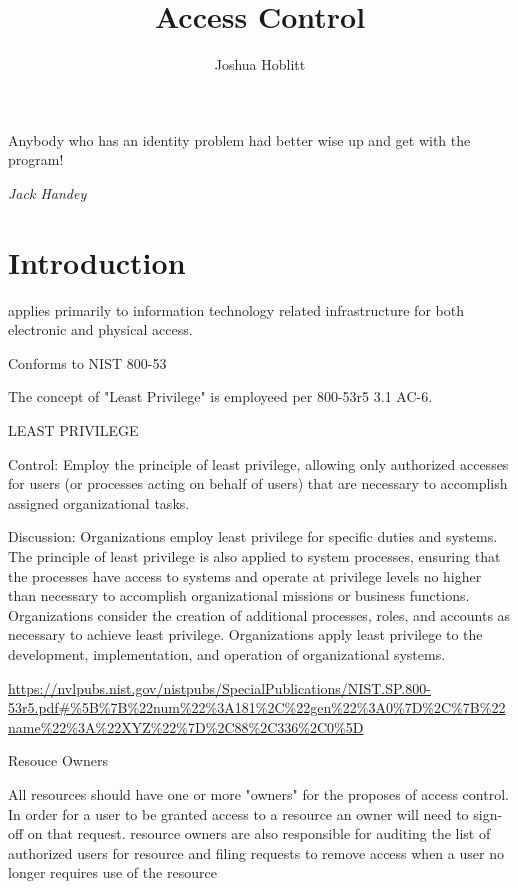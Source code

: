 \documentclass[PMO,authoryear,toc]{lsstdoc}
\title{Access Control}
\author{%
Joshua Hoblitt
}
\date{\vcsDate}
\begin{document}
\maketitle


\epigraph{Anybody who has an identity problem had better wise up and get with the
program!}{\textit{Jack Handey}}

\section{Introduction}\label{sec:intro}

applies primarily to information technology related infrastructure for both electronic and physical access.

Conforms to NIST 800-53

The concept of "Least Privilege" is employeed per 800-53r5 3.1 AC-6.

\begin{displayquote}
LEAST PRIVILEGE

Control: Employ the principle of least privilege, allowing only authorized accesses for users (or
processes acting on behalf of users) that are necessary to accomplish assigned organizational
tasks.

Discussion: Organizations employ least privilege for specific duties and systems. The principle of
least privilege is also applied to system processes, ensuring that the processes have access to
systems and operate at privilege levels no higher than necessary to accomplish organizational
missions or business functions. Organizations consider the creation of additional processes, roles,
and accounts as necessary to achieve least privilege. Organizations apply least privilege to the
development, implementation, and operation of organizational systems.
\end{displayquote}

\url{https://nvlpubs.nist.gov/nistpubs/SpecialPublications/NIST.SP.800-53r5.pdf#%5B%7B%22num%22%3A181%2C%22gen%22%3A0%7D%2C%7B%22name%22%3A%22XYZ%22%7D%2C88%2C336%2C0%5D}

Resouce Owners

All resources should have one or more "owners" for the proposes of access control. In order for a user to be granted access to a resource an owner will need to sign-off on that request.  resource owners are also responsible for auditing the list of authorized users for resource and filing requests to remove access when a user no longer requires use of the resource
\end{document}
